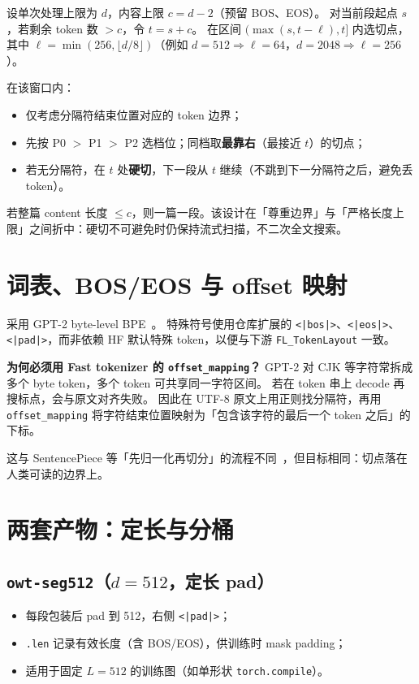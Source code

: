 \documentclass[UTF8,a4paper,11pt]{ctexart}
\begin{document}
设单次处理上限为 $d$，内容上限 $c = d - 2$（预留 BOS、EOS）。
对当前段起点 $s$，若剩余 token 数 $> c$，令 $t = s + c$。
在区间 $(\max(s, t - \ell), t]$ 内选切点，其中 $\ell = \min(256, \lfloor d/8 \rfloor)$（例如 $d=512 \Rightarrow \ell=64$，$d=2048 \Rightarrow \ell=256$）。

在该窗口内：
\begin{itemize}
  \item 仅考虑分隔符结束位置对应的 token 边界；
  \item 先按 P0 $>$ P1 $>$ P2 选档位；同档取\textbf{最靠右}（最接近 $t$）的切点；
  \item 若无分隔符，在 $t$ 处\textbf{硬切}，下一段从 $t$ 继续（不跳到下一分隔符之后，避免丢 token）。
\end{itemize}

若整篇 content 长度 $\le c$，则一篇一段。该设计在「尊重边界」与「严格长度上限」之间折中：硬切不可避免时仍保持流式扫描，不二次全文搜索。

\section{词表、BOS/EOS 与 offset 映射}
\label{sec:offset}

采用 GPT-2 byte-level BPE~\cite{radford2019language}。
特殊符号使用仓库扩展的 \texttt{<|bos|>}、\texttt{<|eos|>}、\texttt{<|pad|>}，而非依赖 HF 默认特殊 token，以便与下游 \texttt{FL\_TokenLayout} 一致。

\textbf{为何必须用 Fast tokenizer 的 \texttt{offset\_mapping}？}
GPT-2 对 CJK 等字符常拆成多个 byte token，多个 token 可共享同一字符区间。
若在 token 串上 decode 再搜标点，会与原文对齐失败。
因此在 UTF-8 原文上用正则找分隔符，再用 \texttt{offset\_mapping} 将字符结束位置映射为「包含该字符的最后一个 token 之后」的下标。

这与 SentencePiece 等「先归一化再切分」的流程不同~\cite{kudo2018sentencepiece}，但目标相同：切点落在人类可读的边界上。

\section{两套产物：定长与分桶}

\subsection{\texttt{owt-seg512}（$d=512$，定长 pad）}

\begin{itemize}
  \item 每段包装后 pad 到 512，右侧 \texttt{<|pad|>}；
  \item \texttt{.len} 记录有效长度（含 BOS/EOS），供训练时 mask padding；
  \item 适用于固定 $L=512$ 的训练图（如单形状 \texttt{torch.compile}）。
\end{itemize}
\end{document}
